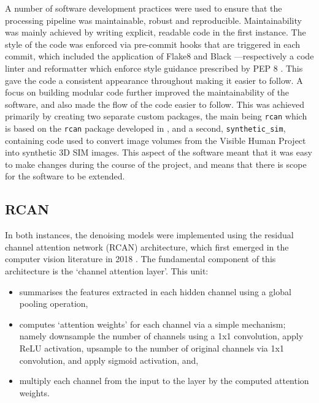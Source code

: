 \documentclass[12pt]{article}
\begin{document}
A number of software development practices were used to ensure that the processing pipeline was maintainable, robust and reproducible.
Maintainability was mainly achieved by writing explicit, readable code in the first instance.
The style of the code was enforced via pre-commit hooks that are triggered in each commit,
which included the application of Flake8 \cite{flake8} and Black \cite{black}---respectively a code linter and reformatter which enforce style guidance prescribed by PEP 8 \cite{pep8}.
This gave the code a consistent appearance throughout making it easier to follow.
A focus on building modular code further improved the maintainability of the software,
and also made the flow of the code easier to follow.
This was achieved primarily by creating two separate custom packages,
the main being \texttt{rcan} which is based on the \texttt{rcan} package developed in \cite{rcan2021},
and a second, \texttt{synthetic\_sim}, containing code used to convert image volumes from the Visible Human Project into synthetic 3D SIM images.
This aspect of the software meant that it was easy to make changes during the course of the project,
and means that there is scope for the software to be extended.

\subsection{RCAN}

In both instances, the denoising models were implemented using the residual channel attention network (RCAN) architecture,
which first emerged in the computer vision literature in 2018 \cite{rcan2018}.
The fundamental component of this architecture is the `channel attention layer'.
This unit:

\begin{itemize}
    \item summarises the features extracted in each hidden channel using a global pooling operation,
    \item computes `attention weights' for each channel via a simple mechanism;
    namely downsample the number of channels using a 1x1 convolution,
    apply ReLU activation,
    upsample to the number of original channels via 1x1 convolution,
    and apply sigmoid activation, and,
    \item multiply each channel from the input to the layer by the computed attention weights.
\end{itemize}
\end{document}
